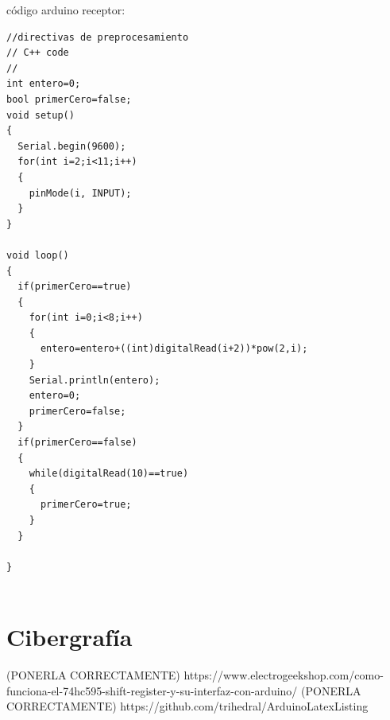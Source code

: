 \documentclass{article}
\begin{document}
código arduino receptor:
\begin{lstlisting}[style=myArduino]//directivas de preprocesamiento
// C++ code
//
int entero=0;
bool primerCero=false;
void setup()
{
  Serial.begin(9600);
  for(int i=2;i<11;i++)
  {
    pinMode(i, INPUT);
  }
}

void loop()
{
  if(primerCero==true)
  {
    for(int i=0;i<8;i++)
    {
      entero=entero+((int)digitalRead(i+2))*pow(2,i);
    }
    Serial.println(entero);
    entero=0;
    primerCero=false;
  }
  if(primerCero==false)
  {
    while(digitalRead(10)==true)
    {
      primerCero=true;
    }
  }
  
}
 
\end{lstlisting}




\section{Cibergrafía} \label{ciber}
(PONERLA CORRECTAMENTE)
https://www.electrogeekshop.com/como-funciona-el-74hc595-shift-register-y-su-interfaz-con-arduino/
\newline (PONERLA CORRECTAMENTE) https://github.com/trihedral/ArduinoLatexListing
\end{document}
